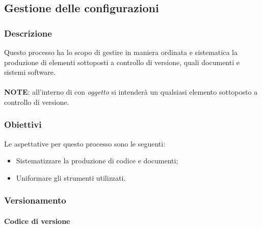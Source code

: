 \subsection{Gestione delle configurazioni}
\label{sub:gestione_configurazioni}

\subsubsection{Descrizione}
\label{ssub:gestione_configurazione:descrizione}

Questo processo ha lo scopo di gestire in maniera ordinata e sistematica la produzione di elementi sottoposti a controllo di versione, 
quali documenti e sistemi software.
\\
\\
\textbf{NOTE}: all'interno di  con \emph{oggetto} si intenderà un qualsiasi elemento sottoposto a 
controllo di versione.

\subsubsection{Obiettivi}
\label{ssub:gestione_configurazione:obiettivi}

Le aspettative per questo processo sono le seguenti:
\begin{itemize}
    \item Sistematizzare la produzione di codice e documenti;
    \item Uniformare gli strumenti utilizzati.
\end{itemize}

\subsubsection{Versionamento}
\label{ssub:gestione_configurazione:versionamento}

\paragraph{Codice di versione}
\label{par:codice_versione}

